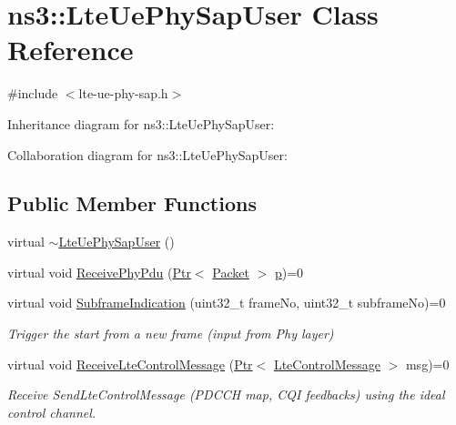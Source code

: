 \hypertarget{classns3_1_1LteUePhySapUser}{}\section{ns3\+:\+:Lte\+Ue\+Phy\+Sap\+User Class Reference}
\label{classns3_1_1LteUePhySapUser}


{\ttfamily \#include $<$lte-\/ue-\/phy-\/sap.\+h$>$}



Inheritance diagram for ns3\+:\+:Lte\+Ue\+Phy\+Sap\+User\+:


Collaboration diagram for ns3\+:\+:Lte\+Ue\+Phy\+Sap\+User\+:
\subsection*{Public Member Functions}
\begin{DoxyCompactItemize}
\item 
virtual \hyperlink{classns3_1_1LteUePhySapUser_a06ebfa9ee54c8f0755d17af2636854b8}{$\sim$\+Lte\+Ue\+Phy\+Sap\+User} ()
\item 
virtual void \hyperlink{classns3_1_1LteUePhySapUser_a1094992006613cee03c3a758ad868028}{Receive\+Phy\+Pdu} (\hyperlink{classns3_1_1Ptr}{Ptr}$<$ \hyperlink{classns3_1_1Packet}{Packet} $>$ \hyperlink{lte__link__budget__x2__handover__measures_8m_ac9de518908a968428863f829398a4e62}{p})=0
\item 
virtual void \hyperlink{classns3_1_1LteUePhySapUser_a355a0cf4c6d549ee7b3a7df0d0485bda}{Subframe\+Indication} (uint32\+\_\+t frame\+No, uint32\+\_\+t subframe\+No)=0
\begin{DoxyCompactList}\small\item\em Trigger the start from a new frame (input from Phy layer) \end{DoxyCompactList}\item 
virtual void \hyperlink{classns3_1_1LteUePhySapUser_abf93eec5c0ad47e505381e26b5dc0a85}{Receive\+Lte\+Control\+Message} (\hyperlink{classns3_1_1Ptr}{Ptr}$<$ \hyperlink{classns3_1_1LteControlMessage}{Lte\+Control\+Message} $>$ msg)=0
\begin{DoxyCompactList}\small\item\em Receive Send\+Lte\+Control\+Message (P\+D\+C\+CH map, C\+QI feedbacks) using the ideal control channel. \end{DoxyCompactList}\end{DoxyCompactItemize}


